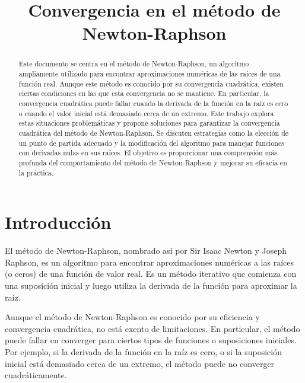 \documentclass[conference]{IEEEtran}
\begin{document}
\title{Convergencia en el método de Newton-Raphson\\}

\author{
	}

\maketitle



\begin{abstract} Este documento se centra en el método de Newton-Raphson, un
	algoritmo ampliamente utilizado para encontrar aproximaciones numéricas
	de las raíces de una función real. Aunque este método es conocido por su
	convergencia cuadrática, existen ciertas condiciones en las que esta
	convergencia no se mantiene. En particular, la convergencia cuadrática
	puede fallar cuando la derivada de la función en la raíz es cero o cuando
	el valor inicial está demasiado cerca de un extremo\cite{convergence}. Este
	trabajo explora
	estas situaciones problemáticas y propone soluciones para garantizar
	la convergencia cuadrática del método de Newton-Raphson. Se discuten
	estrategias como la elección de un punto de partida adecuado y la
	modificación del algoritmo para manejar funciones con derivadas nulas
	en sus raíces. El objetivo es proporcionar una comprensión más profunda
	del comportamiento del método de Newton-Raphson y mejorar su eficacia
	en la práctica.
\end{abstract}

\section{Introducción}

El método de Newton-Raphson, nombrado así por Sir Isaac Newton y Joseph
Raphson, es un algoritmo para encontrar aproximaciones numéricas a las
raíces (o ceros) de una función de valor real. Es un método iterativo
que comienza con una suposición inicial y luego utiliza la derivada de
la función para aproximar la raíz\cite{metodos_numericos}.

Aunque el método de Newton-Raphson es conocido por su eficiencia y
convergencia cuadrática, no está exento de limitaciones. En particular,
el método puede fallar en converger para ciertos tipos de funciones o
suposiciones iniciales. Por ejemplo, si la derivada de la función en la
raíz es cero, o si la suposición inicial está demasiado cerca de un extremo,
el método puede no converger cuadráticamente.
\end{document}
